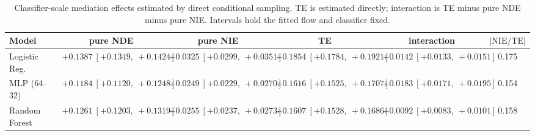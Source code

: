 \begin{table}[htbp]
  \centering
  \caption{Classifier-scale mediation effects estimated by direct conditional sampling. TE is estimated directly; interaction is TE minus pure NDE minus pure NIE. Intervals hold the fitted flow and classifier fixed.}
  \label{tab:adult_gap_overall}
  \begin{tabular}{lccccc}
    \toprule
    Model & pure NDE & pure NIE & TE & interaction & $|\mathrm{NIE}/\mathrm{TE}|$ \\
    \midrule
    Logistic Reg. & $+0.1387\ [+0.1349,\ +0.1424]$ & $+0.0325\ [+0.0299,\ +0.0351]$ & $+0.1854\ [+0.1784,\ +0.1921]$ & $+0.0142\ [+0.0133,\ +0.0151]$ & 0.175 \\
    MLP (64--32) & $+0.1184\ [+0.1120,\ +0.1248]$ & $+0.0249\ [+0.0229,\ +0.0270]$ & $+0.1616\ [+0.1525,\ +0.1707]$ & $+0.0183\ [+0.0171,\ +0.0195]$ & 0.154 \\
    Random Forest & $+0.1261\ [+0.1203,\ +0.1319]$ & $+0.0255\ [+0.0237,\ +0.0273]$ & $+0.1607\ [+0.1528,\ +0.1686]$ & $+0.0092\ [+0.0083,\ +0.0101]$ & 0.158 \\
    \bottomrule
  \end{tabular}
\end{table}